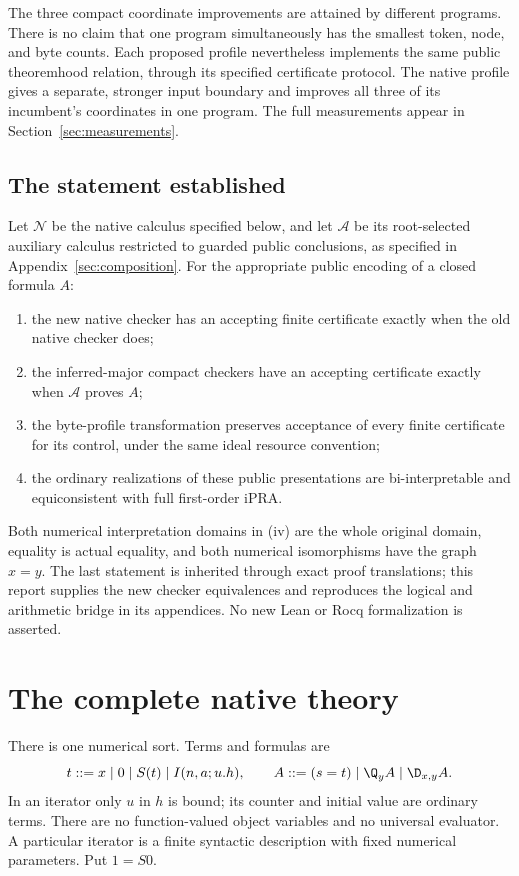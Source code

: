 The three compact coordinate improvements are attained by different
programs. There is no claim that one program simultaneously has the
smallest token, node, and byte counts. Each proposed profile nevertheless
implements the same public theoremhood relation, through its specified
certificate protocol. The native profile gives a separate, stronger input
boundary and improves all three of its incumbent's coordinates in one
program. The full measurements appear in Section~\ref{sec:measurements}.

\subsection{The statement established}

Let $\mathcal N$ be the native calculus specified below, and let
$\mathcal A$ be its root-selected auxiliary calculus restricted to guarded
public conclusions, as specified in Appendix~\ref{sec:composition}.
For the appropriate public encoding of a closed formula $A$:
\begin{enumerate}[label=(\roman*)]
\item the new native checker has an accepting finite certificate exactly
      when the old native checker does;
\item the inferred-major compact checkers have an accepting certificate
      exactly when $\mathcal A$ proves $A$;
\item the byte-profile transformation preserves acceptance of every finite
      certificate for its control, under the same ideal resource convention;
\item the ordinary realizations of these public presentations are
      bi-interpretable and equiconsistent with full first-order iPRA.
\end{enumerate}
Both numerical interpretation domains in (iv) are the whole original
domain, equality is actual equality, and both numerical isomorphisms have
the graph $x=y$. The last statement is inherited through exact proof
translations; this report supplies the new checker equivalences and
reproduces the logical and arithmetic bridge in its appendices. No new
Lean or Rocq formalization is asserted.

\section{The complete native theory}
\label{sec:main-theory}

There is one numerical sort. Terms and formulas are
\[
 t ::= x\mid 0\mid S(t)\mid I(n,a;u.h),\qquad
 A ::= (s=t)\mid\Q_y A\mid\D_{x,y}A.
\]
In an iterator only $u$ in $h$ is bound; its counter and initial value are
ordinary terms. There are no function-valued object variables and no
universal evaluator. A particular iterator is a finite syntactic
description with fixed numerical parameters. Put $1=S0$.

